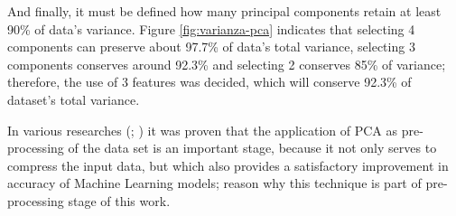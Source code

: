\vspace{5mm} %

And finally, it must be defined how many principal components retain at least 90\% of data's variance. Figure \ref{fig:varianza-pca} indicates that selecting 4 components can preserve about 97.7\% of data's total variance, selecting 3 components conserves around 92.3\% and selecting 2 conserves 85\% of variance; therefore, the use of 3 features was decided, which will conserve 92.3\% of dataset's total variance.

\vspace{5mm} %

In various researches (; ) it was proven that the application of PCA as pre-processing of the data set is an important stage, because it not only serves to compress the input data, but which also provides a satisfactory improvement in accuracy of Machine Learning models; reason why this technique is part of pre-processing stage of this work.


